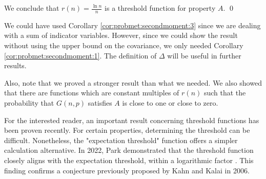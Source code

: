We conclude that $r(n) = \frac{\ln n}{n}$ is a threshold function for property $A$. \qed \par
We could have used Corollary \ref{cor:probmet:secondmoment:3} since we are dealing with a sum of indicator variables. However, since we could show the result without using the upper bound on the covariance, we only needed Corollary \ref{cor:probmet:secondmoment:1}. The definition of $\Delta$ will be useful in further results. \par 
Also, note that we proved a stronger result than what we needed. We also showed that there are functions which are constant multiples of $r(n)$ such that the probability that $G(n, p)$ satisfies $A$ is close to one or close to zero. \par
For the interested reader, an important result concerning threshold functions has been proven recently. For certain properties, determining the threshold can be difficult. Nonetheless, the "expectation threshold" function offers a simpler calculation alternative. In 2022, Park demonstrated that the threshold function closely aligns with the expectation threshold, within a logarithmic factor \cite{park2023proof}. This finding confirms a conjecture previously proposed by Kahn and Kalai in 2006.  \par
